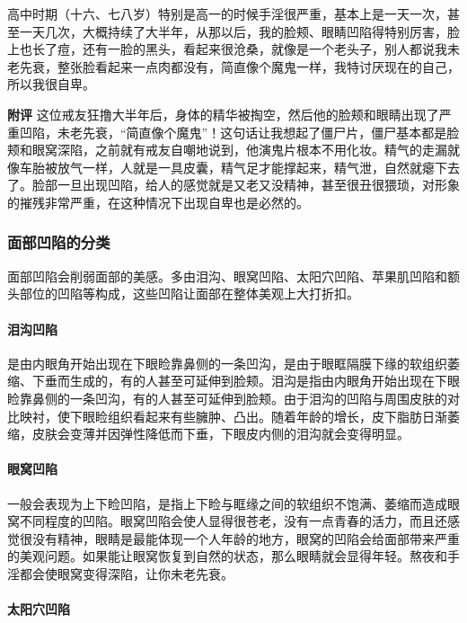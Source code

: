 \begin{case}[面部凹陷]
    高中时期（十六、七八岁）特别是高一的时候手淫很严重，基本上是一天一次，甚至一天几次，大概持续了大半年，从那以后，我的脸颊、眼睛凹陷得特别厉害，脸上也长了痘，还有一脸的黑头，看起来很沧桑，就像是一个老头子，别人都说我未老先衰，整张脸看起来一点肉都没有，简直像个魔鬼一样，我特讨厌现在的自己，所以我很自卑。

    \textbf{附评} 这位戒友狂撸大半年后，身体的精华被掏空，然后他的脸颊和眼睛出现了严重凹陷，未老先衰，“简直像个魔鬼”！这句话让我想起了僵尸片，僵尸基本都是脸颊和眼窝深陷，之前就有戒友自嘲地说到，他演鬼片根本不用化妆。精气的走漏就像车胎被放气一样，人就是一具皮囊，精气足才能撑起来，精气泄，自然就瘪下去了。脸部一旦出现凹陷，给人的感觉就是又老又没精神，甚至很丑很猥琐，对形象的摧残非常严重，在这种情况下出现自卑也是必然的。
\end{case}

\subsubsection{面部凹陷的分类}

面部凹陷会削弱面部的美感。多由泪沟、眼窝凹陷、太阳穴凹陷、苹果肌凹陷和额头部位的凹陷等构成，这些凹陷让面部在整体美观上大打折扣。

\paragraph{泪沟凹陷}

是由内眼角开始出现在下眼睑靠鼻侧的一条凹沟，是由于眼眶隔膜下缘的软组织萎缩、下垂而生成的，有的人甚至可延伸到脸颊。泪沟是指由内眼角开始出现在下眼睑靠鼻侧的一条凹沟，有的人甚至可延伸到脸颊。由于泪沟的凹陷与周围皮肤的对比映衬，使下眼睑组织看起来有些臃肿、凸出。随着年龄的增长，皮下脂肪日渐萎缩，皮肤会变薄并因弹性降低而下垂，下眼皮内侧的泪沟就会变得明显。

\paragraph{眼窝凹陷}

一般会表现为上下睑凹陷，是指上下睑与眶缘之间的软组织不饱满、萎缩而造成眼窝不同程度的凹陷。眼窝凹陷会使人显得很苍老，没有一点青春的活力，而且还感觉很没有精神，眼睛是最能体现一个人年龄的地方，眼窝的凹陷会给面部带来严重的美观问题。如果能让眼窝恢复到自然的状态，那么眼睛就会显得年轻。熬夜和手淫都会使眼窝变得深陷，让你未老先衰。

\paragraph{太阳穴凹陷}

